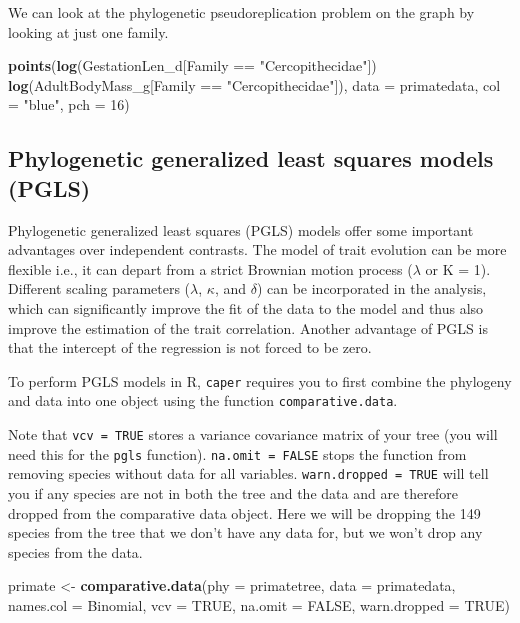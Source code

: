 \documentclass[12pt]{article}
\newcommand{\KeywordTok}[1]{\textcolor[rgb]{0.13,0.29,0.53}{\textbf{{#1}}}}
\newcommand{\DataTypeTok}[1]{\textcolor[rgb]{0.13,0.29,0.53}{{#1}}}
\newcommand{\DecValTok}[1]{\textcolor[rgb]{0.00,0.00,0.81}{{#1}}}
\newcommand{\StringTok}[1]{\textcolor[rgb]{0.31,0.60,0.02}{{#1}}}
\newcommand{\OtherTok}[1]{\textcolor[rgb]{0.56,0.35,0.01}{{#1}}}
\newcommand{\NormalTok}[1]{{#1}}
\begin{document}
We can look at the phylogenetic pseudoreplication problem on the graph by looking at just one family.

\begin{snugshade}
\begin{Highlighting}[]
\KeywordTok{points}\NormalTok{(}\KeywordTok{log}\NormalTok{(GestationLen_d[Family ==}\StringTok{ "Cercopithecidae"}\NormalTok{]) ~}
      \StringTok{ }\KeywordTok{log}\NormalTok{(AdultBodyMass_g[Family ==}\StringTok{ } \StringTok{"Cercopithecidae"}\NormalTok{]), }
       \DataTypeTok{data =} \NormalTok{primatedata, }\DataTypeTok{col =} \StringTok{"blue"}\NormalTok{, }\DataTypeTok{pch =} \DecValTok{16}\NormalTok{)}
\end{Highlighting}
\end{snugshade}

\newpage
\subsection{Phylogenetic generalized least squares models (PGLS)}
Phylogenetic generalized least squares (PGLS) models offer some important advantages over independent contrasts. The model of trait evolution can be more flexible i.e., it can depart from a strict Brownian motion process ($\lambda$ or K = 1). Different scaling parameters ($\lambda$, $\kappa$, and $\delta$) can be incorporated in the analysis, which can significantly improve the fit of the data to the model and thus also improve the estimation of the trait correlation. Another advantage of PGLS is that the intercept of the regression is not forced to be zero.

To perform PGLS models in R, \texttt{caper} requires you to first combine the phylogeny and data into one object using the function \texttt{comparative.data}. 

Note that \texttt{vcv = TRUE} stores a variance covariance matrix of your tree (you will need this for the \texttt{pgls} function). \texttt{na.omit = FALSE} stops the function from removing species without data for all variables. \texttt{warn.dropped = TRUE} will tell you if any species are not in both the tree and the data and are therefore dropped from the comparative data object. Here we will be dropping the 149 species from the tree that we don't have any data for, but we won't drop any species from the data.

\begin{snugshade}
\begin{Highlighting}[]
\NormalTok{primate <-}\StringTok{ }\KeywordTok{comparative.data}\NormalTok{(}\DataTypeTok{phy =} \NormalTok{primatetree, }\DataTypeTok{data =} \NormalTok{primatedata, }
                            \DataTypeTok{names.col =} \NormalTok{Binomial, }\DataTypeTok{vcv =} \OtherTok{TRUE}\NormalTok{, }
                            \DataTypeTok{na.omit =} \OtherTok{FALSE}\NormalTok{, }\DataTypeTok{warn.dropped =} \OtherTok{TRUE}\NormalTok{)}
\end{Highlighting}
\end{snugshade}
\end{document}
